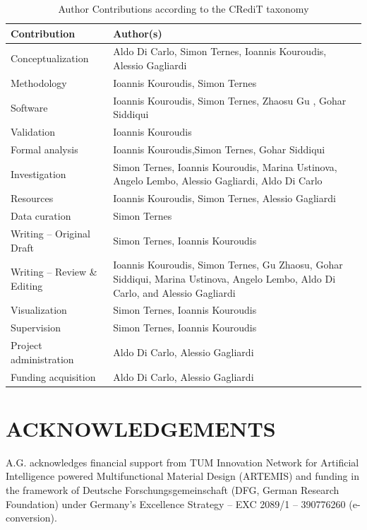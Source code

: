 \documentclass[
  english,        %
  font=times,     %
  onecolumn,      %
]{article}
\begin{document}
\begin{table}[ht]
\centering
\caption{Author Contributions according to the CRediT taxonomy}
\label{tab:credit}
\begin{tabular}{p{4.5cm}p{10cm}}
\hline
\textbf{Contribution} & \textbf{Author(s)} \\
\hline
Conceptualization & Aldo Di Carlo, Simon Ternes, Ioannis Kouroudis,  Alessio Gagliardi \\
Methodology & Ioannis Kouroudis, Simon Ternes \\
Software & Ioannis Kouroudis, Simon Ternes, Zhaosu Gu , Gohar Siddiqui \\
Validation & Ioannis Kouroudis \\
Formal analysis &  Ioannis Kouroudis,Simon Ternes, Gohar Siddiqui\\
Investigation & Simon Ternes, Ioannis Kouroudis, Marina Ustinova, Angelo Lembo, Alessio Gagliardi, Aldo Di Carlo \\
Resources & Ioannis Kouroudis, Simon Ternes, Alessio Gagliardi \\
Data curation & Simon Ternes \\
Writing -- Original Draft & Simon Ternes, Ioannis Kouroudis \\
Writing -- Review \& Editing & Ioannis Kouroudis, Simon Ternes, Gu Zhaosu, Gohar Siddiqui, Marina Ustinova, Angelo Lembo, Aldo Di Carlo, and Alessio Gagliardi \\
Visualization & Simon Ternes, Ioannis Kouroudis \\
Supervision & Simon Ternes,  Ioannis Kouroudis\\
Project administration & Aldo Di Carlo, Alessio Gagliardi \\
Funding acquisition &  Aldo Di Carlo, Alessio Gagliardi  \\
\hline
\end{tabular}
\end{table}

\FloatBarrier
\section*{ACKNOWLEDGEMENTS}

  A.G. acknowledges financial support from TUM Innovation Network for Artificial Intelligence powered Multifunctional Material Design (ARTEMIS) and funding in the framework of Deutsche Forschungsgemeinschaft (DFG, German Research Foundation) under Germany's Excellence Strategy – EXC 2089/1 – 390776260 (e-conversion).
\end{document}
